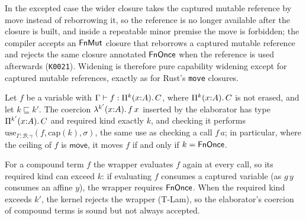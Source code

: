 In the excepted case the wider closure takes the captured mutable reference by move instead of reborrowing it, so the reference is no longer available after the closure is built, and inside a repeatable minor premise the move is forbidden; the compiler accepts an $\mathsf{FnMut}$ closure that reborrows a captured mutable reference and rejects the same closure annotated $\mathsf{FnOnce}$ when the reference is used afterwards (\texttt{K0021}).
Widening is therefore pure capability widening except for captured mutable references, exactly as for Rust's \lstinline|move| closures.

\begin{lemma}[Coercion]\label{lem:coercion}
Let $f$ be a variable with $\Gamma \vdash f : \Pi^{k}(x{:}A).\,C$, where $\Pi^{k}(x{:}A).\,C$ is not erased, and let $k \sqsubseteq k'$.
The coercion $\lambda^{k'}(x{:}A).\,f\,x$ inserted by the elaborator has type $\Pi^{k'}(x{:}A).\,C$ and required kind exactly $k$, and checking it performs $\mathrm{use}_{\Gamma;\mathcal{B};\gamma}(f, \mathrm{cap}(k), \sigma)$, the same use as checking a call $f\,a$; in particular, where the ceiling of $f$ is $\mathsf{move}$, it moves $f$ if and only if $k = \mathsf{FnOnce}$.
\end{lemma}

For a compound term $f$ the wrapper evaluates $f$ again at every call, so its required kind can exceed $k$: if evaluating $f$ consumes a captured variable (as $g\,y$ consumes an affine $y$), the wrapper requires $\mathsf{FnOnce}$. When the required kind exceeds $k'$, the kernel rejects the wrapper (T-Lam), so the elaborator's coercion of compound terms is sound but not always accepted.

